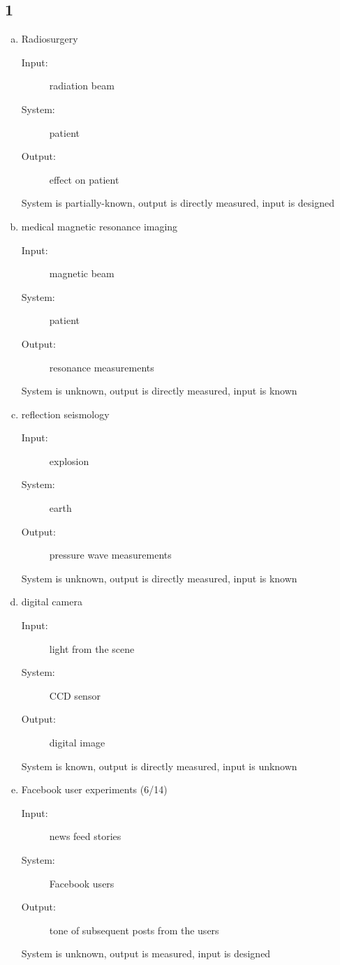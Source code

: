 \documentclass[10pt, letterpaper]{article}
\begin{document}
\subsection*{1}
\begin{enumerate}[a.]
\item Radiosurgery

\begin{description}
    \item[Input:] radiation beam
    \item[System:] patient
    \item[Output:] effect on patient
\end{description}

System is partially-known, output is directly measured, input is designed


\item medical magnetic resonance imaging

\begin{description}
    \item[Input:] magnetic beam
    \item[System:] patient
    \item[Output:] resonance measurements
\end{description}

System is unknown, output is directly measured, input is known

\item reflection seismology

\begin{description}
    \item[Input:] explosion
    \item[System:] earth
    \item[Output:] pressure wave measurements
\end{description}

System is unknown, output is directly measured, input is known

\item digital camera

\begin{description}
    \item[Input:] light from the scene
    \item[System:] CCD sensor
    \item[Output:] digital image
\end{description}

System is known, output is directly measured, input is unknown

\item Facebook user experiments (6/14)

\begin{description}
    \item[Input:] news feed stories
    \item[System:] Facebook users
    \item[Output:] tone of subsequent posts from the users
\end{description}

System is unknown, output is measured, input is designed
\end{enumerate}
\end{document}
